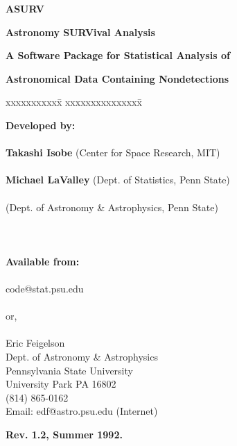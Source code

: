 \marginparwidth 0pt
\oddsidemargin  0pt
\evensidemargin  0pt
\marginparsep 0pt
\topmargin=0.0in
\textwidth=6.25in
\textheight=8.25in
\pagestyle{plain}
\parskip=5pt
\parindent=30pt


\thispagestyle{empty}

\centerline{\Huge\bf  ASURV}
\bigskip
\centerline{\Huge\bf Astronomy SURVival Analysis }

\bigskip
\bigskip
\bigskip
\bigskip
\centerline{\LARGE\bf  A Software Package for Statistical Analysis of }

\bigskip
\centerline{\LARGE\bf  Astronomical Data Containing Nondetections}

\bigskip
\bigskip
\bigskip
\bigskip
\begin{tabbing}
      xxxxxxxxxxx\= \kill
                 \>xxxxxxxxxxxxxxx\=   \kill

      {\Large\bf Developed by: } \\
    \> \\
                 \> {\Large\bf Takashi Isobe } (Center for Space Research, MIT)  \\

    \> \\
           \> {\Large\bf Michael LaValley } (Dept. of Statistics, Penn State)\\

    \> \\
                 (Dept. of Astronomy \& Astrophysics, Penn State) \\
    \> \\
    \> \\
    \> \\


       {\Large\bf Available from: }   \\
                 \>                   \\
                 \> code@stat.psu.edu \\
                 \>                   \\
                 \>or,                \\
                 \>                   \\
                 \> Eric Feigelson     \\
                 \> Dept. of Astronomy \& Astrophysics  \\
                 \> Pennsylvania State University \\
                 \> University Park PA  16802 \\
                 \> (814) 865-0162 \\
                 \>  Email:  edf@astro.psu.edu  (Internet)\\
\end{tabbing}
\bigskip
\bigskip
\bigskip
\bigskip
\bigskip
\centerline{\Large\bf Rev. 1.2, Summer 1992.}
\newpage


